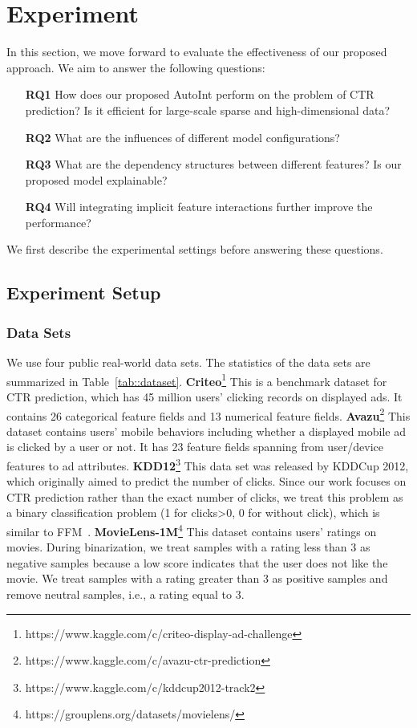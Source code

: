 \section{Experiment}
In this section, we move forward to evaluate the effectiveness of our proposed approach. We aim to answer the following questions:



\begin{itemize}[leftmargin=6ex,labelsep=1ex]
\raggedright
	\item[\textbf{RQ1}] How does our proposed AutoInt perform on the problem of CTR prediction? Is it efficient for large-scale sparse and high-dimensional data?
	\item[\textbf{RQ2}] What are the influences of different model configurations?
	\item[\textbf{RQ3}] What are the dependency structures between different features? Is our proposed model explainable?
   	\item[\textbf{RQ4}] Will integrating implicit feature interactions further improve the performance?
\end{itemize}
We first describe the experimental settings before answering these questions.

\subsection{Experiment Setup}

\subsubsection{Data Sets}\label{subsubsec::data}
We use four public real-world data sets. The statistics of the data sets are summarized in Table~\ref{tab::dataset}.
\textbf{Criteo}\footnote{https://www.kaggle.com/c/criteo-display-ad-challenge} This is a benchmark dataset for CTR prediction, which has 45 million users' clicking records on displayed ads. It contains 26 categorical feature fields and 13 numerical feature fields. \textbf{Avazu}\footnote{https://www.kaggle.com/c/avazu-ctr-prediction} This dataset contains users' mobile behaviors including whether a displayed mobile ad is clicked by a user or not. It has 23 feature fields spanning from user/device features to ad attributes.  
\textbf{KDD12}\footnote{https://www.kaggle.com/c/kddcup2012-track2} This data set was released by KDDCup 2012, which originally aimed to predict the number of clicks. Since our work focuses on CTR prediction rather than the exact number of clicks, we treat this problem as a binary classification problem (1 for clicks>0, 0 for without click), which is similar to FFM~\cite{juan2016field}.
\textbf{MovieLens-1M}\footnote{https://grouplens.org/datasets/movielens/} This dataset contains users' ratings on movies. During binarization, we treat samples with a rating less than 3 as negative samples because a low score indicates that the user does not like the movie. We treat samples with a rating greater than 3 as positive samples and remove neutral samples, i.e., a rating equal to 3.

